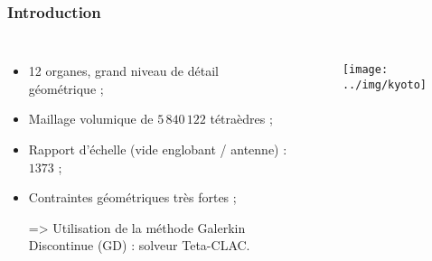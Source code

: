 \begin{frame}
\frametitle{Introduction}
\vfill
\begin{columns}[c]
\begin{itemize}
\item 12 organes, grand niveau de détail géométrique ;
\item Maillage volumique de $5\,840\,122$ tétraèdres ;
\item Rapport d'échelle (vide englobant / antenne) : $1373$ ;
\item Contraintes géométriques très fortes ;
\item[=>] Utilisation de la méthode Galerkin Discontinue (GD) : solveur Teta-CLAC.
\end{itemize}
\vfill
{}
\begin{figure}
\texttt{[image: ../img/kyoto]}
\end{figure}
\end{columns}
\vfill
\end{frame}
